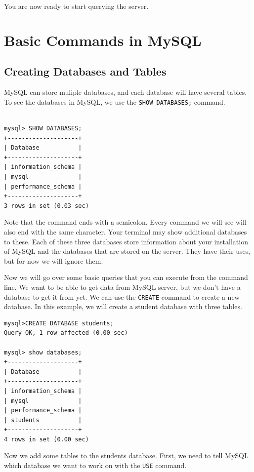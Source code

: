 You are now ready to start querying the server.

\section*{Basic Commands in MySQL}

\subsection{Creating Databases and Tables}

MySQL can store muliple databases, and each database will have several tables.  To see the databases in MySQL, we use the {\tt SHOW DATABASES;} command.

\begin{lstlisting}

mysql> SHOW DATABASES;
+--------------------+
| Database           |
+--------------------+
| information_schema |
| mysql              |
| performance_schema |
+--------------------+
3 rows in set (0.03 sec)

\end{lstlisting}

Note that the command ends with a semicolon. Every command we will see will also end with the same character.  Your terminal may show additional databases to these.  Each of these three databases store information about your installation of MySQL and the databases that are stored on the server.  They have their uses, but for now we will ignore them.

Now we will go over some basic queries that you can execute from the command line.  We want to be able to get data from MySQL server, but we don't have a database to get it from yet.  We can use the {\tt CREATE} command to create a new database.  In this example, we will create a student database with three tables.

\begin{lstlisting}
mysql>CREATE DATABASE students;
Query OK, 1 row affected (0.00 sec)

mysql> show databases;
+--------------------+
| Database           |
+--------------------+
| information_schema |
| mysql              |
| performance_schema |
| students           |
+--------------------+
4 rows in set (0.00 sec)

\end{lstlisting}

Now we add some tables to the students database.  First, we need to tell MySQL which database we want to work on with the {\tt USE} command.

